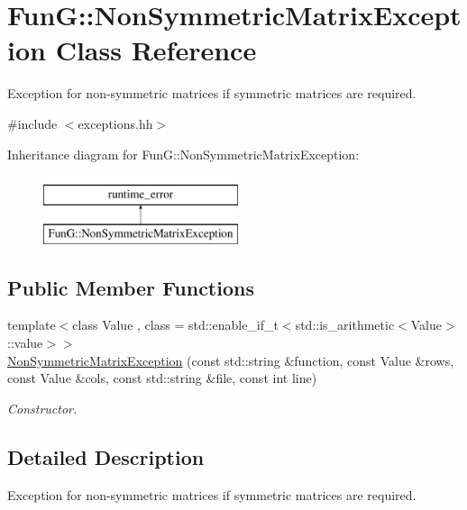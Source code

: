 \hypertarget{classFunG_1_1NonSymmetricMatrixException}{\section{Fun\-G\-:\-:Non\-Symmetric\-Matrix\-Exception Class Reference}
\label{classFunG_1_1NonSymmetricMatrixException}
}


Exception for non-\/symmetric matrices if symmetric matrices are required.  




{\ttfamily \#include $<$exceptions.\-hh$>$}

Inheritance diagram for Fun\-G\-:\-:Non\-Symmetric\-Matrix\-Exception\-:\begin{figure}[H]
\begin{center}
\leavevmode
\includegraphics[height=2.000000cm]{classFunG_1_1NonSymmetricMatrixException}
\end{center}
\end{figure}
\subsection*{Public Member Functions}
\begin{DoxyCompactItemize}
\item 
{\footnotesize template$<$class Value , class  = std\-::enable\-\_\-if\-\_\-t$<$std\-::is\-\_\-arithmetic$<$\-Value$>$\-::value$>$$>$ }\\\hyperlink{classFunG_1_1NonSymmetricMatrixException_a1c11fd643c37e5fa2145aba2cc7ab09d}{Non\-Symmetric\-Matrix\-Exception} (const std\-::string \&function, const Value \&rows, const Value \&cols, const std\-::string \&file, const int line)
\begin{DoxyCompactList}\small\item\em Constructor. \end{DoxyCompactList}\end{DoxyCompactItemize}


\subsection{Detailed Description}
Exception for non-\/symmetric matrices if symmetric matrices are required. 

